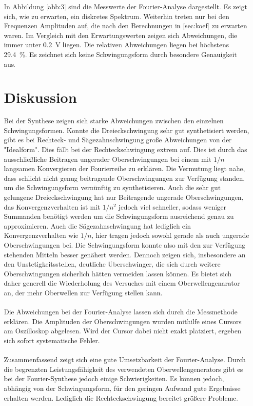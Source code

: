 In Abbildung \ref{abb:3} sind die Messwerte der Fourier-Analyse dargestellt. Es zeigt sich,
wie zu erwarten, ein diskretes Spektrum. Weiterhin treten nur bei den Frequenzen Amplituden
auf, die nach den Berechnungen in \ref{sec:koef} zu erwarten waren. Im Vergleich mit den
Erwartungswerten zeigen sich Abweichungen, die immer unter \SI{0.2}{\volt} liegen.
Die relativen Abweichungen liegen bei höchstens \SI{29.4}{\percent}. Es zeichnet sich
keine Schwingungsform durch besondere Genauigkeit aus.
\section{Diskussion}
Bei der Synthese zeigen sich starke Abweichungen zwischen den einzelnen Schwingungsformen.
Konnte die Dreieckschwingung sehr gut synthetisiert werden, gibt es bei Rechteck- und Sägezahnschwingung
große Abweichungen von der "Idealform". Dies fällt bei der Rechteckschwingung extrem auf.
Dies ist durch das ausschließliche Beitragen ungerader Oberschwingungen bei einem mit
$1/n$ langsamen Konvergieren der Fourierreihe zu erklären. Die Vermutung liegt nahe,
dass schlicht nicht genug beitragende Oberschwingungen zur Verfügung standen, um die
Schwingungsform vernünftig zu synthetisieren. Auch die sehr gut gelungene Dreieckschwingung
hat nur Beitragende ungerade Oberschwingungen, das Konvergenzverhalten ist mit $1/n^2$
jedoch viel schneller, sodass weniger Summanden benötigt werden um die Schwingungsform
ausreichend genau zu approximieren. Auch die Sägezahnschwingung hat lediglich ein
Konvergenzverhalten wie $1/n$, hier tragen jedoch sowohl gerade als auch ungerade Oberschwingungen
bei. Die Schwingungsform konnte also mit den zur Verfügung stehenden Mitteln besser genähert werden.
Dennoch zeigen sich, insbesondere an den Unstetigkeitsstellen, deutliche Überschwinger, die
sich durch weitere Oberschwingungen sicherlich hätten vermeiden lassen können. Es bietet sich daher
generell die Wiederholung des Versuches mit einem Oberwellengenarator an, der mehr
Oberwellen zur Verfügung stellen kann.\\
\\
Die Abweichungen bei der Fourier-Analyse lassen sich durch die Messmethode erklären.
Die Amplituden der Oberschwingungen wurden mithilfe eines Cursors am Oszilloskop abgelesen.
Wird der Cursor dabei nicht exakt platziert, ergeben sich sofort systematische Fehler.\\
\\
Zusammenfassend zeigt sich eine gute Umsetzbarkeit der Fourier-Analyse. Durch die begrenzten
Leistungsfähigkeit des verwendeten Oberwellengenerators gibt es bei der Fourier-Synthese
jedoch einige Schwierigkeiten. Es können jedoch, abhängig von der Schwingungsform, für
den geringen Aufwand gute Ergebnisse erhalten werden. Lediglich die Rechteckschwingung
bereitet größere Probleme.
\newpage
\nocite{*}
\printbibliography
